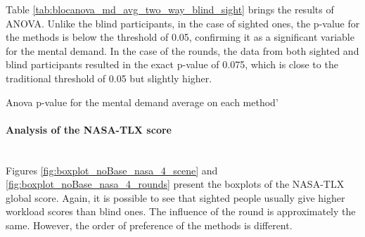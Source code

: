 Table \ref{tab:blocanova_md_avg_two_way_blind_sight} brings the results of ANOVA. Unlike the blind participants, in the case of sighted ones, the p-value for the methods is below the threshold of 0.05, confirming it as a significant variable for the mental demand. In the case of the rounds, the data from both sighted and blind participants resulted in the exact p-value of 0.075, which is close to the traditional threshold of 0.05 but slightly higher. 

\begin{table}[!htb]
    \caption{Anova p-value for the mental demand average on each method'}
    \label{tab:blocanova_md_avg_two_way_blind_sight}
\begin{minipage}{0.45\linewidth}
    
\end{minipage}%
\begin{minipage}{0.05\linewidth}
    \hfill
\end{minipage}%
\begin{minipage}{0.45\linewidth}
        
\end{minipage}
\end{table}




\paragraph*{Analysis of the NASA-TLX score}\mbox{}\\

Figures \ref{fig:boxplot_noBase_nasa_4_scene} and \ref{fig:boxplot_noBase_nasa_4_rounds} present the boxplots of the NASA-TLX global score. Again, it is possible to see that sighted people usually give higher workload scores than blind ones. The influence of the round is approximately the same. However, the order of preference of the methods is different.

